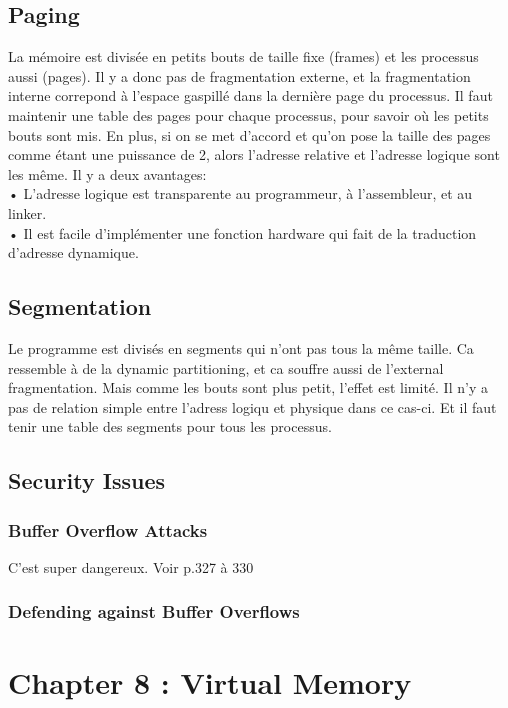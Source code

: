 \subsection{Paging}
La mémoire est divisée en petits bouts de taille fixe (frames) et les processus aussi (pages). Il y a donc pas de fragmentation externe, et la fragmentation interne correpond à l’espace gaspillé dans la dernière page du processus. Il faut maintenir une table des pages pour chaque processus, pour savoir où les petits bouts sont mis. En plus, si on se met d’accord et qu’on pose la taille des pages comme étant une puissance de 2, alors l’adresse relative et l’adresse logique sont les même. Il y a deux avantages: \\
• L’adresse logique est transparente au programmeur, à l’assembleur, et au linker.  \\
• Il est facile d’implémenter une fonction hardware qui fait de la traduction d’adresse
dynamique.
\subsection{Segmentation}
Le programme est divisés en segments qui n’ont pas tous la même taille. Ca ressemble à de la dynamic partitioning, et ca souffre aussi de l’external fragmentation. Mais comme les bouts sont plus petit, l’effet est limité. Il n’y a pas de relation simple entre l’adress logiqu et physique dans ce cas-ci. Et il faut tenir une table des segments pour tous les processus.
\subsection{Security Issues}
\subsubsection{Buffer Overflow Attacks}
C’est super dangereux. Voir p.327 à 330
\subsubsection{Defending against Buffer Overflows}

\newpage


\section{Chapter 8 : Virtual Memory}

